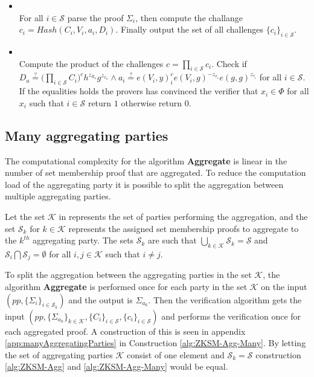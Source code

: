 \begin{algorithm}[]
\begin{itemize}
\item {}\\
For all $i\in\mathcal{S}$ parse the proof $\Sigma_i$, then compute the challange $c_i = Hash(C_i,V_i,a_i,D_i)$. Finally output the set of all challenges $\{c_i\}_{i\in\mathcal{S}}$. 

\item{} \\
Compute the product of the challenges $c=\prod_{i\in\mathcal{S}} c_i$. Check if $D_a\overset{?}{=} \big( \prod_{i\in\mathcal{S}}C_i\big)^ch^{z_R_a}g^{z_x_a}\wedge a_i \overset{?}{=} e(V_i,y)^c_i e(V_i,g)^{-z_{x_i}}e(g,g)^{z_{\tau_i}}$ for all $i\in\mathcal{S}$. If the equalities holds the provers has convinced the verifier that $x_i\in\Phi$ for all $x_i$ such that $i\in\mathcal{S}$ return $1$ otherwise return $0$.
\end{itemize}
\label{alg:ZKSM-Agg}
\end{algorithm} 
 
\subsection*{Many aggregating parties}
The computational complexity for the algorithm \textbf{Aggregate} is linear in the number of set membership proof that are aggregated. To reduce the computation load of the aggregating party it is possible to split the aggregation between multiple aggregating parties. 

Let the set $\mathcal{K}$ in represents the set of parties performing the aggregation, and the set $\mathcal{S}_k$ for $k\in\mathcal{K}$ represents the assigned set membership proofs to aggregate to the $k^{th}$ aggregating party. The sets $\mathcal{S}_k$ are such that $\bigcup_{k\in\mathcal{K}}\mathcal{S}_k = \mathcal{S}$ and $\mathcal{S}_i\bigcap \mathcal{S}_j= \emptyset$ for all $i,j\in\mathcal{K}$ such that $i\neq j$. 

To split the aggregation between the aggregating parties in the set $\mathcal{K}$, the algorithm \textbf{Aggregate} is performed once for each party in the set $\mathcal{K}$ on the input $(pp,\{\Sigma_i\}_{i\in\mathcal{S}_k})$ and the output is $\Sigma_{a_k}$. Then the verification algorithm gets the input $(pp,\{\Sigma_{a_k}\}_{k\in\mathcal{K}},\{C_i\}_{i\in\mathcal{S}},\{c_i\}_{i\in\mathcal{S}} )$ and performs the verification once for each aggregated proof. A construction of this is seen in appendix \ref{app:manyAggregatingParties} in Construction \ref{alg:ZKSM-Agg-Many}. By letting the set of aggregating parties $\mathcal{K}$ consist of one element and $\mathcal{S}_k  = \mathcal{S}$ construction \ref{alg:ZKSM-Agg} and \ref{alg:ZKSM-Agg-Many} would be equal. 


